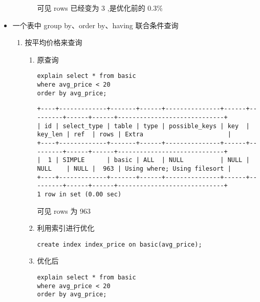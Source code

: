 \documentclass[11pt]{article}
\begin{document}
\begin{itemize}
\begin{enumerate}
\begin{enumerate}
可见 rows 已经变为 3 ,是优化前的 0.3\%
\end{enumerate}
\end{enumerate}
\item 一个表中 group by、order by、having 联合条件查询
\label{sec-3-2-1-8}
\begin{enumerate}
\item 按平均价格来查询
\begin{enumerate}
\item 原查询

\begin{lstlisting}
explain select * from basic
where avg_price < 20
order by avg_price;
\end{lstlisting}

\begin{verbatim}
+----+-------------+-------+------+---------------+------+---------+------+------+-----------------------------+
| id | select_type | table | type | possible_keys | key  | key_len | ref  | rows | Extra                       |
+----+-------------+-------+------+---------------+------+---------+------+------+-----------------------------+
|  1 | SIMPLE      | basic | ALL  | NULL          | NULL | NULL    | NULL |  963 | Using where; Using filesort |
+----+-------------+-------+------+---------------+------+---------+------+------+-----------------------------+
1 row in set (0.00 sec)
\end{verbatim}

可见 rows 为 963

\item 利用索引进行优化

\begin{lstlisting}
create index index_price on basic(avg_price);
\end{lstlisting}

\item 优化后

\begin{lstlisting}
explain select * from basic
where avg_price < 20
order by avg_price;
\end{lstlisting}


\end{enumerate}
\end{enumerate}
\end{itemize}
\end{document}
